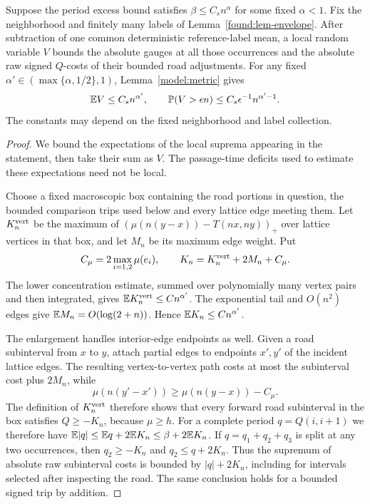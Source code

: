 \begin{lemma}
\label{found:lem-gauge-tail}
Suppose the period excess bound satisfies $\beta\leq C_s n^\alpha$
for some fixed $\alpha<1$.  Fix the neighborhood and finitely many
labels of Lemma~\ref{found:lem-envelope}.  After subtraction of one
common deterministic reference-label mean, a local random variable $V$ bounds the
absolute gauges at all those occurrences and the absolute raw signed
$Q$-costs of their bounded road adjustments.  For any fixed
$\alpha'\in(\max\{\alpha,1/2\},1)$, Lemma~\ref{model:metric} gives
\[
 \mathbb E V\leq C_s n^{\alpha'},\qquad
 \mathbb P (V>\epsilon n)\leq C_s\epsilon^{-1}n^{\alpha'-1}.
\]
The constants may depend on the fixed neighborhood and label collection.
\end{lemma}

\begin{proof}
We bound the expectations of the local suprema appearing in the
statement, then take their sum as $V$.  The passage-time deficits
used to estimate these expectations need not be local.

Choose a fixed macroscopic box containing the road portions in question,
the bounded comparison trips used below and every lattice edge meeting
them.  Let $K_n^{\rm vert}$ be the
maximum of $(\mu(n(y-x))-T(nx,ny))_+$ over lattice vertices in that
box, and let $M_n$ be its maximum edge weight.  Put
\[
 C_\mu=2\max_{i=1,2}\mu(e_i),\qquad
 K_n=K_n^{\rm vert}+2M_n+C_\mu.
\]
The lower concentration estimate, summed over polynomially many
vertex pairs and then integrated, gives
$\mathbb E K_n^{\rm vert}\le C n^{\alpha'}$.  The exponential tail
and $O(n^2)$ edges give $\mathbb E M_n=O(\log(2+n))$.  Hence
$\mathbb E K_n\le Cn^{\alpha'}$.

The enlargement handles interior-edge endpoints as well.  Given a
road subinterval from $x$ to $y$, attach partial edges to endpoints
$x',y'$ of the incident lattice edges.  The resulting vertex-to-vertex
path costs at most the subinterval cost plus $2M_n$, while
\[
 \mu(n(y'-x'))\geq\mu(n(y-x))-C_\mu.
\]
The definition of $K_n^{\rm vert}$ therefore shows that every forward
road subinterval in the box satisfies $Q\geq-K_n$, because $\mu\geq h$.
For a complete period $q=Q(i,i+1)$ we therefore have
$\mathbb E |q|\leq\mathbb E q+2\mathbb E K_n
\leq\beta+2\mathbb E K_n$.
If $q=q_1+q_2+q_3$ is split at any two occurrences, then
$q_2\geq-K_n$ and $q_2\leq q+2K_n$.
Thus the supremum of absolute raw subinterval costs is bounded by
$|q|+2K_n$, including for intervals selected after inspecting the road.
The same conclusion holds for a bounded signed trip by addition.


\end{proof}
